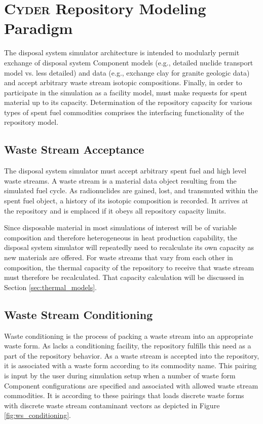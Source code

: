 \section{\textsc{Cyder} Repository Modeling Paradigm}

The \Cyder disposal system simulator architecture is intended to modularly permit 
exchange of disposal system Component models (e.g., detailed nuclide transport 
model vs. less detailed) and data (e.g., exchange clay for granite geologic 
data) and accept arbitrary waste stream isotopic compositions.  
Finally, in order to participate in the simulation as a facility model, \Cyder must 
make requests for spent material up to its capacity. Determination of the 
repository capacity for various types of spent fuel commodities comprises the 
interfacing functionality of the repository model.

\subsection{Waste Stream Acceptance}

The disposal system simulator must accept arbitrary spent fuel and high level waste 
streams. A waste stream is a material data object resulting from the \Cyclus 
simulated fuel cycle.  As radionuclides are gained, lost, and transmuted within 
the spent fuel object, a history of its isotopic composition is recorded.  It 
arrives at the repository and is emplaced if it obeys all repository capacity 
limits. 

Since disposable material in most simulations of interest will be of variable 
composition and therefore heterogeneous in heat production capability, the 
disposal system simulator will repeatedly need to recalculate its own capacity 
as new materials are offered.  For waste streams that vary from each other in 
composition, the thermal capacity of the repository to receive that waste 
stream must therefore be recalculated.  That capacity calculation will be 
discussed in Section \ref{sec:thermal_models}. 

\subsection{Waste Stream Conditioning}

Waste conditioning is the process of packing a waste stream into an appropriate 
waste form. As \Cyclus lacks a conditioning facility, the \Cyder repository 
fulfills this need as a part of the repository behavior. As a waste stream is 
accepted into the repository, it is associated with a waste form according 
to its commodity name. This pairing is input by the user during simulation 
setup when a number of waste form Component configurations are specified and 
associated with allowed waste stream commodities. It is according to these 
pairings that \Cyder loads discrete waste forms with discrete waste 
stream contaminant vectors as depicted in Figure \ref{fig:ws_conditioning}.

